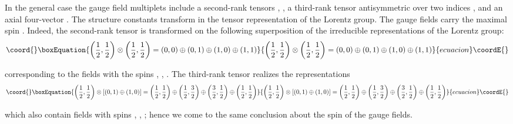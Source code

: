 \documentclass[a4paper,12pt]{article}
\begin{document}
In the general case the gauge field multiplets \coordHE{} include
a second-rank tensors \coordHE{}, \coordHE{}, a third-rank tensor antisymmetric over two indices \coordHE{}, and an axial four-vector \coordHE{}.
The structure constants \coordHE{} transform in the tensor
representation of the Lorentz group. The gauge fields carry the
maximal spin \coordHE{}. Indeed, the second-rank tensor \coordHE{}
is transformed on the following superposition of the irreducible
representations of the Lorentz group:
\begin{equation}\coord{}\boxEquation{
\left( \frac 12,\frac 12\right) \otimes \left( \frac 12,\frac 12\right)
=\left( 0,0\right) \oplus \left( 0,1\right) \oplus \left( 1,0\right) \oplus
\left( 1,1\right)  \label{107}
}{
\left( \frac 12,\frac 12\right) \otimes \left( \frac 12,\frac 12\right)
=\left( 0,0\right) \oplus \left( 0,1\right) \oplus \left( 1,0\right) \oplus
\left( 1,1\right)  }{ecuacion}\coordE{}\end{equation}

corresponding to the fields with the spins \coordHE{}, \coordHE{}, \coordHE{}. The third-rank
tensor \coordHE{} realizes the representations
\begin{equation}\coord{}\boxEquation{
\left( \frac 12,\frac 12\right) \otimes \left[ \left( 0,1\right) \oplus
\left( 1,0\right) \right] =\left( \frac 12,\frac 12\right) \oplus \left(
\frac 12,\frac 32\right) \oplus \left( \frac 32,\frac 12\right) \oplus
\left( \frac 12,\frac 12\right)  \label{108}
}{
\left( \frac 12,\frac 12\right) \otimes \left[ \left( 0,1\right) \oplus
\left( 1,0\right) \right] =\left( \frac 12,\frac 12\right) \oplus \left(
\frac 12,\frac 32\right) \oplus \left( \frac 32,\frac 12\right) \oplus
\left( \frac 12,\frac 12\right)  }{ecuacion}\coordE{}\end{equation}

which also contain fields with spins \coordHE{}, \coordHE{}, \coordHE{}; hence we come to the
same conclusion about the spin of the gauge fields.
\end{document}
